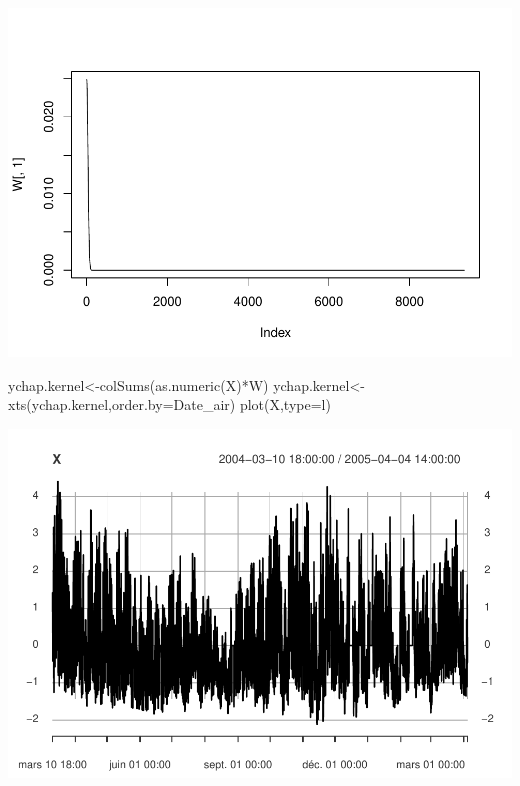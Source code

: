 \documentclass[
]{article}
\newenvironment{Shaded}{\begin{snugshade}}{\end{snugshade}}
\newcommand{\AttributeTok}[1]{\textcolor[rgb]{0.77,0.63,0.00}{#1}}
\newcommand{\FunctionTok}[1]{\textcolor[rgb]{0.00,0.00,0.00}{#1}}
\newcommand{\NormalTok}[1]{#1}
\newcommand{\OtherTok}[1]{\textcolor[rgb]{0.56,0.35,0.01}{#1}}
\newcommand{\SpecialCharTok}[1]{\textcolor[rgb]{0.00,0.00,0.00}{#1}}
\newcommand{\StringTok}[1]{\textcolor[rgb]{0.31,0.60,0.02}{#1}}
\begin{document}
\includegraphics{STA202_report_files/figure-latex/tests-1.pdf}

\begin{Shaded}
\begin{Highlighting}[]
\NormalTok{ychap.kernel}\OtherTok{\textless{}{-}}\FunctionTok{colSums}\NormalTok{(}\FunctionTok{as.numeric}\NormalTok{(X)}\SpecialCharTok{*}\NormalTok{W)}
\NormalTok{ychap.kernel}\OtherTok{\textless{}{-}}\FunctionTok{xts}\NormalTok{(ychap.kernel,}\AttributeTok{order.by=}\NormalTok{Date\_air)}
\FunctionTok{plot}\NormalTok{(X,}\AttributeTok{type=}\StringTok{\textquotesingle{}l\textquotesingle{}}\NormalTok{)}
\end{Highlighting}
\end{Shaded}

\includegraphics{STA202_report_files/figure-latex/tests-2.pdf}
\end{document}
